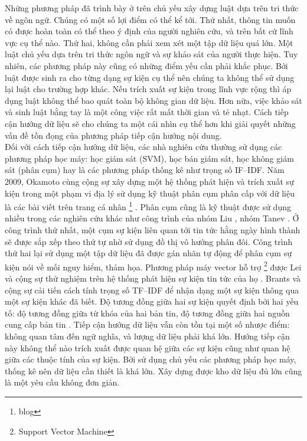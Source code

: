 \noident Những phương pháp đã trình bày ở trên chủ yếu xây dựng luật dựa trên tri thức về ngôn ngữ. Chúng có một số lợi điểm có thể kể tới. Thứ nhất, thông tin muốn có được hoàn toàn có thể theo ý định của người nghiên cứu, và trên bất cứ lĩnh vực cụ thể nào. Thứ hai, không cần phải xem xét một tập dữ liệu quá lớn. Một luật chủ yếu dựa trên tri thức ngôn ngữ và sự khảo sát của người thực hiện. Tuy nhiên, các  phương pháp này cũng có những điểm yếu cần phải khắc phục. Bởi luật được sinh ra cho từng dạng sự kiện cụ thể nên chúng ta không thể sử dụng lại luật cho trường hợp khác. Nếu trích xuất sự kiện trong lĩnh vực rộng thì áp dụng luật không thể bao quát toàn bộ không gian dữ liệu. Hơn nữa, việc khảo sát và sinh luật bằng tay là một công việc rất mất thời gian và tẻ nhạt. Cách tiếp cận hướng dữ liệu sẽ cho chúng ta một cái nhìn cụ thể hơn khi giải quyết những vấn đề tồn đọng của phương pháp tiếp cận hướng nội dung.
\\
\noindent Đối với  cách tiếp cận hướng dữ liệu, các nhà nghiên cứu thường sử dụng các phương pháp học máy: học giám sát (SVM), học bán giám sát, học không giám sát (phân cụm) hay là các  phương pháp thống kê như trọng số IF--IDF. Năm 2009, Okamoto cùng cộng sự xây dựng một hệ thống phát hiện và trích xuất sự kiện trong một phạm vi địa lý sử dụng kỹ thuật  phân cụm phân cấp với dữ liệu là các bài viết trên trang cá nhân \footnote{blog} \cite{MM09}. Phân cụm cũng là kỹ thuật được sử dụng nhiều trong các nghiên cứu khác như công trình của nhóm  Liu \cite{MYL08}, nhóm Tanev \cite{HJM08}. Ở công trình thứ nhất, một cụm sự kiện liên quan tới tin tức hằng ngày  hình thành sẽ được sắp xếp theo thứ tự nhờ sử dụng đồ thị vô hướng phân đôi. Công trình thứ hai lại sử dụng một tập dữ liệu đã được gán nhãn tự động để phân cụm sự kiện nói về mối nguy hiểm, thảm họa. Phương pháp máy vector hỗ trợ \footnote{Support Vector Machine} được Lei và cộng sự thử nghiệm trên hệ thống phát hiện sự kiện tin tức của họ \cite{LWZ05}. Brants và cộng sự cải tiến cách tính  trọng số TF--IDF để nhận dạng một sự kiện thông qua một sự kiện khác đã biết. Độ tương đồng giữa hai sự kiện quyết định bởi hai yếu tố: độ tương đồng giữa từ khóa của hai bản tin, độ tương đồng giữa hai nguồn cung cấp bản tin \cite{TFA03}. Tiếp cận hướng dữ liệu vẫn còn tồn tại một số nhược điểm: không quan tâm đến ngữ nghĩa, và lượng dữ liệu phải khá lớn. Hướng tiếp cận này không thể nào trích xuất được quan hệ giữa các sự kiện cũng như quan hệ giữa các thuộc tính của sự kiện. Bởi sử dụng chủ yếu các phương pháp học máy, thống kê nên dữ liệu cần thiết là khá lớn. Xây dựng được kho dữ liệu đủ lớn cũng là một yêu cầu không đơn giản.
